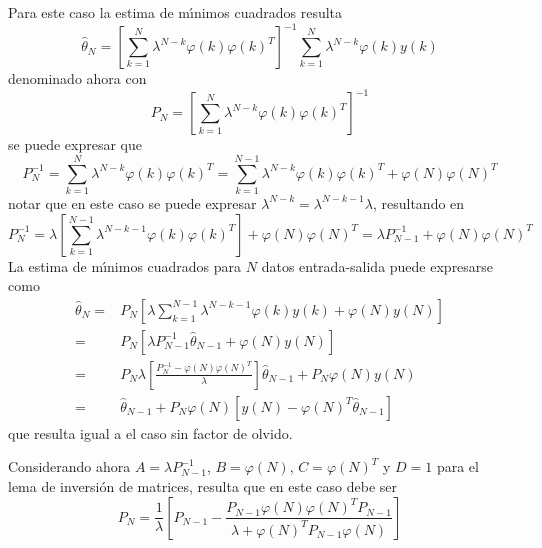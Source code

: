 Para este caso la estima de m{\'\i}nimos cuadrados resulta
\begin{equation}\label{a_2}
\hat{\theta}_N=\left[\sum_{k=1}^{N}\lambda^{N-k}\varphi(k)\varphi(k)^T\right]^{-1}\sum_{k=1}^{N}\lambda^{N-k}\varphi(k)y(k)
\end{equation}
denominado ahora con
\begin{equation}\label{a_3}
    P_{N}=\left[\sum_{k=1}^{N}\lambda^{N-k}\varphi(k)\varphi(k)^T\right]^{-1}
\end{equation}
se puede expresar que
\begin{equation}
    P^{-1}_{N}=\sum_{k=1}^{N}\lambda^{N-k}\varphi(k)\varphi(k)^T=
               \sum_{k=1}^{N-1}\lambda^{N-k}\varphi(k)\varphi(k)^T+\varphi(N)\varphi(N)^T
\end{equation}
notar que en este caso se puede expresar $\lambda^{N-k}=\lambda^{N-k-1}\lambda$, resultando en
\begin{equation}
    P^{-1}_{N}=\lambda\left[\sum_{k=1}^{N-1}\lambda^{N-k-1}\varphi(k)\varphi(k)^T\right]+\varphi(N)\varphi(N)^T=
               \lambda P^{-1}_{N-1}+\varphi(N)\varphi(N)^T
\end{equation}
La estima de m{\'\i}nimos cuadrados para $N$ datos entrada-salida puede expresarse como
\begin{equation}
\begin{split}
\hat{\theta}_{N}=&P_{N}\left[\lambda\sum_{k=1}^{N-1}\lambda^{N-k-1}\varphi(k)y(k)+\varphi(N)y(N)\right]\\
                =&P_{N}\left[\lambda P_{N-1}^{-1}\hat{\theta}_{N-1}+\varphi(N)y(N)\right]\\
                =&P_{N}\lambda \left[\frac{P_N^{-1}-\varphi(N)\varphi(N)^T}{\lambda}\right]\hat{\theta}_{N-1}+P_N\varphi(N)y(N)\\
                =&\hat{\theta}_{N-1}+P_{N}\varphi(N)\left[y(N)-\varphi(N)^T\hat{\theta}_{N-1}\right]
\end{split}
\end{equation}
que resulta igual a el caso sin factor de olvido.

Considerando ahora $A=\lambda P_{N-1}^{-1}$, $B=\varphi(N)$, $C=\varphi(N)^T$ y $D=1$ para el lema de
inversi{\'o}n de matrices, resulta que en este caso debe ser
\begin{equation}
      P_{N}=\frac{1}{\lambda}\left[P_{N-1}-\frac{P_{N-1}\varphi(N)\varphi(N)^TP_{N-1}}{\lambda+\varphi(N)^TP_{N-1}\varphi(N)}\right]
\end{equation}


